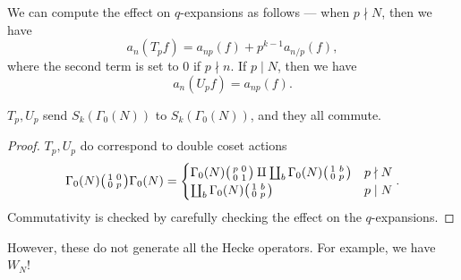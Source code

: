 \documentclass[a4paper]{article}
\begin{document}
We can compute the effect on $q$-expansions as follows --- when $p \nmid N$, then we have
\[
  a_n(T_p f) = a_{np}(f) + p^{k - 1} a_{n/p}(f),
\]
where the second term is set to $0$ if $p \nmid n$. If $p \mid N$, then we have
\[
  a_n(U_p f) = a_{np}(f).
\]
\begin{prop}
  $T_p, U_p$ send $S_k(\Gamma_0(N))$ to $S_k(\Gamma_0(N))$, and they all commute.
\end{prop}

\begin{proof}
  $T_p, U_p$ do correspond to double coset actions
  \[
    \Gamma_0(N)
    \begin{psmallmatrix}
      1 & 0\\
      0 & p
    \end{psmallmatrix}\Gamma_0(N) =
    \begin{cases}
      \Gamma_0(N)
      \begin{psmallmatrix}
        p & 0\\
        0 & 1
      \end{psmallmatrix} \amalg \coprod_b \Gamma_0(N)
      \begin{psmallmatrix}
        1 & b\\
        0 & p
      \end{psmallmatrix} & p \nmid N\\
      \coprod_b \Gamma_0(N)
      \begin{psmallmatrix}
        1 & b\\
        0 & p
      \end{psmallmatrix} & p \mid N\\
    \end{cases}.
  \]
  Commutativity is checked by carefully checking the effect on the $q$-expansions.
\end{proof}
However, these do not generate all the Hecke operators. For example, we have $W_N$!
\end{document}
